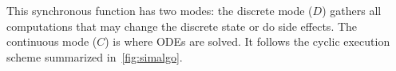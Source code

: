\documentclass[11pt,titlepage,twoside]{report}
\newcommand{\lx}{\ensuremath{\mathit{lx}}}
\begin{document}
This synchronous function has two modes: the discrete mode ($D$) gathers
all computations that may change the discrete state or
do side effects. The continuous mode ($C$) is where ODEs are solved. It 
follows the cyclic execution scheme summarized in~\cref{fig:simalgo}.



\end{document}
